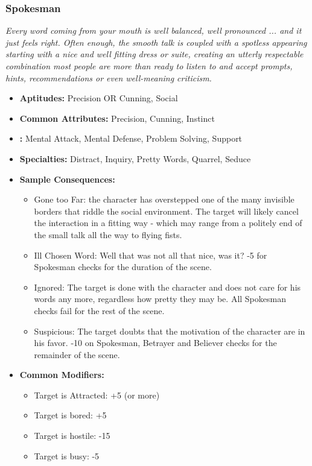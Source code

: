 	\subsubsection{Spokesman}\label{Spokesman}
		\textit{Every word coming from your mouth is well balanced, well pronounced ... and it just feels right.
		Often enough, the smooth talk is coupled with a spotless appearing starting with a nice and well fitting dress or suite, creating an utterly respectable combination most people are more than ready to listen to and accept prompts, hints, recommendations or even well-meaning criticism.}
		\begin{itemize}
			\item \textbf{Aptitudes:} Precision OR Cunning, Social
			\item \textbf{Common Attributes:} Precision, Cunning, Instinct
			\item \textbf{:} Mental Attack, Mental Defense, Problem Solving, Support
			\item \textbf{Specialties:} Distract, Inquiry, Pretty Words, Quarrel, Seduce
			\item \textbf{Sample Consequences:} 
			\begin{itemize}
				\item Gone too Far: the character has overstepped one of the many invisible borders that riddle the social environment. The target will likely cancel the interaction in a fitting way - which may range from a politely end of the small talk all the way to flying fists.
				\item Ill Chosen Word: Well that was not all that nice, was it? -5 for Spokesman checks for the duration of the scene.
				\item Ignored: The target is done with the character and does not care for his words any more, regardless how pretty they may be. All Spokesman checks fail for the rest of the scene.
				\item Suspicious: The target doubts that the motivation of the character are in his favor. -10 on Spokesman, Betrayer and Believer checks for the remainder of the scene.
			\end{itemize}
			\item \textbf{Common Modifiers:}
			\begin{itemize}
				\item Target is Attracted: +5 (or more)
				\item Target is bored: +5
				\item Target is hostile: -15
				\item Target is busy: -5
			\end{itemize}
		\end{itemize}

